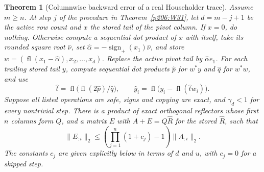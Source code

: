 \documentclass[11pt,oneside,openany]{book}
\theoremstyle{plain}
\newtheorem{theorem}{Theorem}[chapter]
\theoremstyle{definition}
\theoremstyle{remark}
\begin{document}
\begin{theorem}[Columnwise backward error of a real Householder trace]
\label{p206:W32}
Assume \(m\ge n\). At step \(j\) of the procedure in
Theorem~\ref{p206:W31}, let \(d=m-j+1\) be the active row count
and \(x\) the stored tail of the pivot column. If \(x=0\), do
nothing. Otherwise compute a sequential dot product of \(x\) with
itself, take its rounded square root \(\hat\nu\), set
\(\hat\alpha=-\operatorname{sign}_+(x_1)\hat\nu\), and store
\(w=(\operatorname{fl}(x_1-\hat\alpha),x_2,\ldots,x_d)\).
Replace the active pivot tail by \(\hat\alpha e_1\).
For each trailing stored tail \(y\), compute sequential dot
products \(\hat p\) for \(w^*y\) and \(\hat q\) for \(w^*w\), and use
\[
 \hat t=\operatorname{fl}\bigl(\operatorname{fl}(2\hat p)/\hat q\bigr),
 \qquad
 \hat y_i=\operatorname{fl}\bigl(y_i-\operatorname{fl}(\hat t w_i)\bigr).
\]
Suppose all listed operations are safe, signs and copying are exact,
and \(\gamma_d<1\) for every nontrivial step.
There is a product of exact orthogonal reflectors whose first \(n\)
columns form \(Q\), and a matrix \(E\) with \(A+E=Q\hat R\)
for the stored \(\hat R\), such that
\[
       \|E_{:i}\|_2
           \le \left(\prod_{j=1}^{n}(1+c_j)-1\right)\|A_{:i}\|_2 .
\]
The constants \(c_j\) are given explicitly below in terms of
\(d\) and \(u\), with \(c_j=0\) for a skipped step.
\end{theorem}
\end{document}
